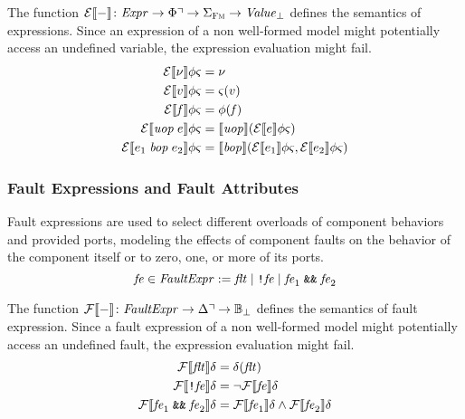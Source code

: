 \documentclass[a4paper,10pt,english]{article}
\begin{document}
The function $\mathcal{E} \llbracket - \rrbracket \colon \mathit{Expr} \rightarrow \Phi\urcorner \rightarrow \Sigma_\textsc{Fm} \rightarrow \mathit{Value}_\bot$ defines the
semantics of expressions. Since an expression of a non well-formed model might potentially access an undefined variable, the expression
evaluation might fail. 
\begin{align*}
	\mathcal{E} \llbracket \nu \rrbracket \phi \varsigma &= \nu \\
	\mathcal{E} \llbracket v \rrbracket \phi \varsigma &= \varsigma(v) \\
	\mathcal{E} \llbracket \mathit{f} \rrbracket \phi \varsigma &= \phi(\mathit{f}) \\
	\mathcal{E} \llbracket \mathit{uop}\; e \rrbracket \phi \varsigma &= \llbracket \mathit{uop} \rrbracket (\mathcal{E} \llbracket e \rrbracket \phi
	\varsigma) \\
	\mathcal{E} \llbracket e_1 \;\mathit{bop}\; e_2 \rrbracket \phi \varsigma &= \llbracket \mathit{bop} \rrbracket
	(\mathcal{E} \llbracket e_1 \rrbracket \phi \varsigma, \mathcal{E} \llbracket e_2 \rrbracket \phi \varsigma)
\end{align*}

\subsubsection{Fault Expressions and Fault Attributes}
Fault expressions are used to select different overloads of component behaviors and provided ports, modeling the effects of
component faults on the behavior of the component itself or to zero, one, or more of its ports.
\begin{equation*}
	\mathit{fe} \in \mathit{FaultExpr} := \mathit{flt} \mid \texttt{!} \mathit{fe} \mid
	\mathit{fe}_1 \; \texttt{\&\&} \; \mathit{fe}_2
\end{equation*}

The function $\mathcal{F} \llbracket - \rrbracket \colon \mathit{FaultExpr} \rightarrow \Delta\urcorner \rightarrow \mathbb{B}_\bot$ defines the
semantics of fault expression. Since a fault expression of a non well-formed model might potentially access an undefined fault,
the expression evaluation might fail.
\begin{align*}
	\mathcal{F} \llbracket \mathit{flt} \rrbracket \delta &= \delta(\mathit{flt}) \\
	\mathcal{F} \llbracket \texttt{!} \mathit{fe} \rrbracket \delta &= \neg \mathcal{F} \llbracket \mathit{fe} \rrbracket \delta \\
	\mathcal{F} \llbracket \mathit{fe}_1 \; \texttt{\&\&} \; \mathit{fe}_2 \rrbracket \delta &= \mathcal{F} \llbracket \mathit{fe}_1 \rrbracket \delta \wedge
	\mathcal{F} \llbracket \mathit{fe}_2 \rrbracket \delta
\end{align*}
\end{document}
